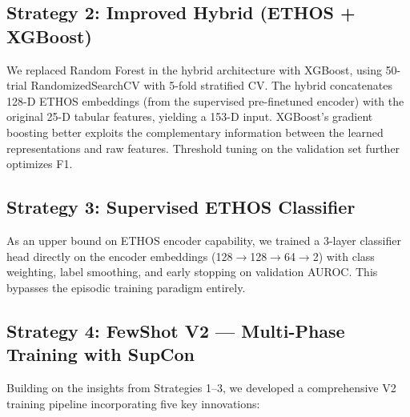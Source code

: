 \subsection{Strategy 2: Improved Hybrid (ETHOS + XGBoost)}

We replaced Random Forest in the hybrid architecture with XGBoost, using 50-trial RandomizedSearchCV with 5-fold stratified CV. The hybrid concatenates 128-D ETHOS embeddings (from the supervised pre-finetuned encoder) with the original 25-D tabular features, yielding a 153-D input. XGBoost's gradient boosting better exploits the complementary information between the learned representations and raw features. Threshold tuning on the validation set further optimizes F1.

\subsection{Strategy 3: Supervised ETHOS Classifier}

As an upper bound on ETHOS encoder capability, we trained a 3-layer classifier head directly on the encoder embeddings (128$\to$128$\to$64$\to$2) with class weighting, label smoothing, and early stopping on validation AUROC. This bypasses the episodic training paradigm entirely.

\subsection{Strategy 4: FewShot V2 --- Multi-Phase Training with SupCon}

Building on the insights from Strategies 1--3, we developed a comprehensive V2 training pipeline incorporating five key innovations:

